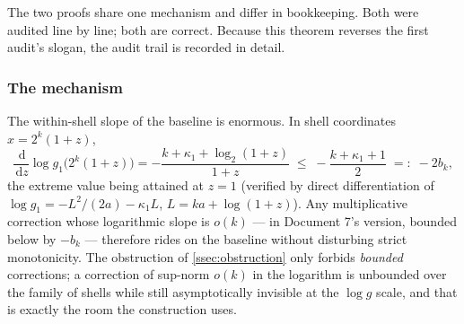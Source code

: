 \documentclass[11pt,oneside]{article}
\theoremstyle{definition}
\theoremstyle{remark}
\newcommand{\dd}{\,\mathrm d}
\begin{document}
The two proofs share one mechanism and differ in bookkeeping.  Both
were audited line by line; both are correct.  Because this theorem
reverses the first audit's slogan, the audit trail is recorded in
detail.

\subsubsection*{The mechanism}

The within-shell slope of the baseline is enormous.  In shell
coordinates $x=2^k(1+z)$,
\begin{equation}
 \frac{\dd}{\dd z}\log g_1\bigl(2^k(1+z)\bigr)
 =-\frac{k+\kappa_1+\log_2(1+z)}{1+z}
 \;\le\;-\frac{k+\kappa_1+1}{2}
 \;=:\;-2b_k,
 \label{eq:baseline-slope}
\end{equation}
the extreme value being attained at $z=1$ (verified by direct
differentiation of $\log g_1=-L^2/(2a)-\kappa_1L$,
$L=ka+\log(1+z)$).  Any multiplicative correction whose logarithmic
slope is $o(k)$ --- in Document 7's version, bounded below by $-b_k$
--- therefore rides on the baseline without disturbing strict
monotonicity.  The obstruction of \cref{ssec:obstruction} only forbids
\emph{bounded} corrections; a correction of sup-norm $o(k)$ in the
logarithm is unbounded over the family of shells while still
asymptotically invisible at the $\log g$ scale, and that is exactly the
room the construction uses.
\end{document}
